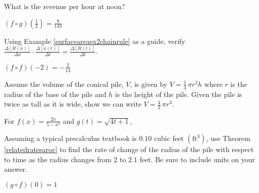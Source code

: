 \documentclass{ximera}
\begin{document}
\begin{question}
What is the revenue per hour at noon?
\begin{solution}
$(f\circ g)\left(\frac{1}{2}\right) = \frac{8}{143}$
\end{solution}

\end{question}

\begin{question}
Using Example \ref{surfaceareaex2chainrule} as a guide, verify $\frac{\Delta[R(x)]}{\Delta x} \cdot \frac{\Delta[x(t)]}{\Delta t} = \frac{\Delta[R(t)]}{\Delta t}$.
\begin{solution}
$(f \circ f)(-2) = -\frac{2}{13}$


\end{solution}

\end{question}

\begin{question}
Assume the volume of the conical pile, $V$,  is given by $V = \frac{1}{3} \, \pi r^2 h$ where $r$ is the radius of the base of the pile and $h$ is the height of the pile.  Given the pile is twice as tall as it is wide, show we can write $V = \frac{4}{3} \, \pi r^3$.
\begin{solution}
For  $f(x) = \frac{2x}{5-x^2}$ and $g(t) = \sqrt{4t+1}$,



\end{solution}

\end{question}

\begin{question}
Assuming a typical precalculus textbook is $0.10$ cubic feet $\left( \text{ft}^3 \right)$, use Theorem \ref{relatedratesaroc} to find the rate of change of the radius of the pile with respect to time as the radius changes from $2$ to $2.1$ feet. Be sure to include units on your answer.
\begin{solution}
$(g\circ f)(0) = 1$
\end{solution}

\end{question}
\end{document}
